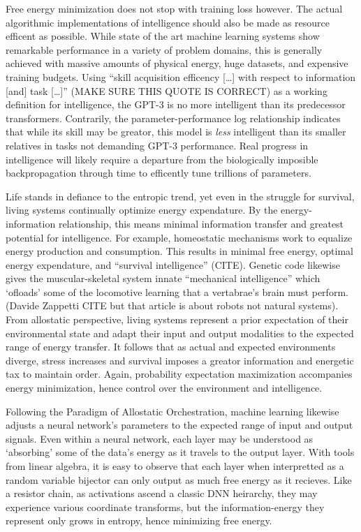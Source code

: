 Free energy minimization does not stop with training loss however. The actual algorithmic implementations of intelligence should also be made as resource efficent as possible. While state of the art machine learning systems show remarkable performance in a variety of problem domains, this is generally achieved with massive amounts of physical energy, huge datasets, and expensive training budgets. Using ``skill acquisition efficency [\dots] with respect to information [and] task [\dots]'' (MAKE SURE THIS QUOTE IS CORRECT) as a working definition for intelligence, the GPT-3 is no more intelligent than its predecessor transformers. Contrarily, the parameter-performance log relationship indicates that while its skill may be greator, this model is \textit{less} intelligent than its smaller relatives in tasks not demanding GPT-3 performance. Real progress in intelligence will likely require a departure from the biologically imposible backpropagation through time to efficently tune trillions of parameters.

Life stands in defiance to the entropic trend, yet even in the struggle for survival, living systems continually optimize energy expendature. By the energy-information relationship, this means minimal information transfer and greatest potential for intelligence. For example, homeostatic mechanisms work to equalize energy production and consumption. This results in minimal free energy, optimal energy expendature, and ``survival intelligence'' (CITE). Genetic code likewise gives the muscular-skeletal system innate ``mechanical intelligence'' which `ofloads' some of the locomotive learning that a vertabrae's brain must perform. (Davide Zappetti CITE but that article is about robots not natural systems). From allostatic perspective, living systems represent a prior expectation of their environmental state and adapt their input and output modalities to the expected range of energy transfer. It follows that as actual and expected environments diverge, stress increases and survival imposes a greator information and energetic tax to maintain order. Again, probability expectation maximization accompanies energy minimization, hence control over the environment and intelligence.

Following the Paradigm of Allostatic Orchestration, machine learning likewise adjusts a neural network's parameters to the expected range of input and output signals. Even within a neural network, each layer may be understood as `absorbing' some of the data's energy as it travels to the output layer. With tools from linear algebra, it is easy to observe that each layer when interpretted as a random variable bijector can only output as much free energy as it recieves. Like a resistor chain, as activations ascend a classic DNN heirarchy, they may experience various coordinate transforms, but the information-energy they represent only grows in entropy, hence minimizing free energy.

